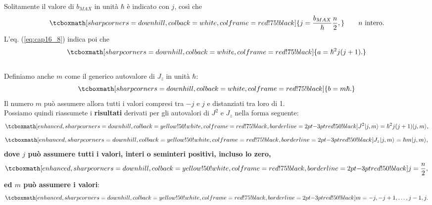 \documentclass[a4paper,12pt,oneside]{book}
\begin{document}
Solitamente il valore di $b_{MAX}$ in unità $\hbar$ è indicato con $j$, così che
	\begin{equation}
		\tcboxmath[sharp corners=downhill, colback=white, colframe=red!75!black]{
			j= \frac{b_{MAX}}{\hbar} \frac{n}{2},
			} \qquad n \textrm{ intero.}
	\end{equation}
L'eq. (\ref{eq:cap16_8}) indica poi che
	\begin{equation}
		\tcboxmath[sharp corners=downhill, colback=white, colframe=red!75!black]{
			a= \hbar ^2 j(j+1).
			}
	\end{equation}\\

Definiamo anche $m$ come il generico autovalore di $J_z$ in unità $\hbar$:
	\begin{equation}
		\tcboxmath[sharp corners=downhill, colback=white, colframe=red!75!black]{
			b=m\hbar .
			}
	\end{equation}
Il numero $m$ può assumere allora tutti i valori compresi tra $-j$ e $j$ e distanziati tra loro di 1.\\

Possiamo quindi riassumete i \textbf{risultati} derivati per gli autovalori di $J^2$ e $J_z$ nella forma seguente:
	\begin{equation}
		 \tcboxmath[enhanced, sharp corners=downhill, colback=yellow!50!white, colframe=red!75!black, borderline={2pt}{-3pt}{red!50!black}]{
		 	J^2\vert j, m \rangle =\hbar ^2 j (j+1)\vert j, m \rangle , 
		 	}
	\end{equation}
	\begin{equation}
		 \tcboxmath[enhanced, sharp corners=downhill, colback=yellow!50!white, colframe=red!75!black, borderline={2pt}{-3pt}{red!50!black}]{
		 	J_z\vert j, m \rangle =\hbar  m\vert j, m \rangle ,
		 	}
	\end{equation}
\textbf{dove $j$ può assumere tutti i valori, interi o seminteri positivi, incluso  lo zero,}
	\begin{equation}
		\tcboxmath[enhanced, sharp corners=downhill, colback=yellow!50!white, colframe=red!75!black, borderline={2pt}{-3pt}{red!50!black}]{
			j= \frac{n}{2},
			}
	\end{equation}
\textbf{ed $m$ può assumere i valori}:
	\begin{equation}
		\tcboxmath[enhanced, sharp corners=downhill, colback=yellow!50!white, colframe=red!75!black, borderline={2pt}{-3pt}{red!50!black}]{
			m=-j, -j+1,\dots , j-1, j.
			}
	\end{equation}\\
	
\end{document}
